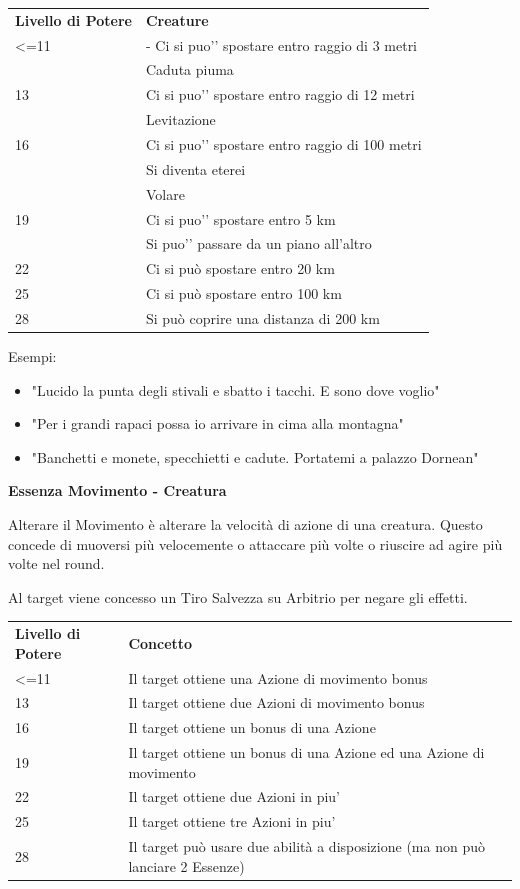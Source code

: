 \documentclass[a4paper,11pt,twoside,openany]{book}
\begin{document}
\begin{tabularx}{\textwidth}{lX}
	\toprule
	\textbf{Livello di Potere} & \textbf{Creature}\tabularnewline
	<=11           & - Ci si puo'’ spostare entro raggio di 3 metri       \\
	               & Caduta piuma                                         \\
	13             & Ci si puo'’ spostare entro raggio di 12 metri        \\
	               & Levitazione                                          \\
	16             & Ci si puo'’ spostare entro raggio di 100 metri       \\
	               & Si diventa eterei                                    \\
	               & Volare                                               \\
	19             & Ci si puo'’ spostare entro 5 km                      \\
	               & Si puo'’ passare da un piano all’altro               \\
	22             & Ci si può spostare entro 20 km\tabularnewline
	25             & Ci si può spostare entro 100 km\tabularnewline
	28             & Si può coprire una distanza di 200 km\tabularnewline
\end{tabularx}

\bigskip

Esempi:
\begin{itemize}
	\item
	      "Lucido la punta degli stivali e sbatto i tacchi. E sono dove voglio"
	\item
	      "Per i grandi rapaci possa io arrivare in cima alla montagna"
	\item
	      "Banchetti e monete, specchietti e cadute. Portatemi a palazzo Dornean"
\end{itemize}

\bigskip

\textbf{Essenza Movimento - Creatura}

Alterare il Movimento è alterare la velocità di azione di una creatura.
Questo concede di muoversi più velocemente o attaccare più volte o riuscire ad agire più volte nel round.

Al target viene concesso un Tiro Salvezza su Arbitrio per negare gli effetti.

\bigskip

\begin{tabularx}{\textwidth}{lX}
	\toprule
	\textbf{Livello di Potere} & \textbf{Concetto}\tabularnewline
	\textless=11         & Il target ottiene una Azione di movimento bonus\tabularnewline
	13       & Il target ottiene due Azioni di movimento bonus\tabularnewline
	16       & Il target ottiene un bonus di una Azione\tabularnewline
	19       & Il target ottiene un bonus di una Azione ed una Azione di movimento\tabularnewline
	22       & Il target ottiene due Azioni in piu'\tabularnewline
	25       & Il target ottiene tre Azioni in piu'\tabularnewline
	28       & Il target può usare due abilità a disposizione (ma non può lanciare 2 Essenze)\tabularnewline
\end{tabularx}
\end{document}
